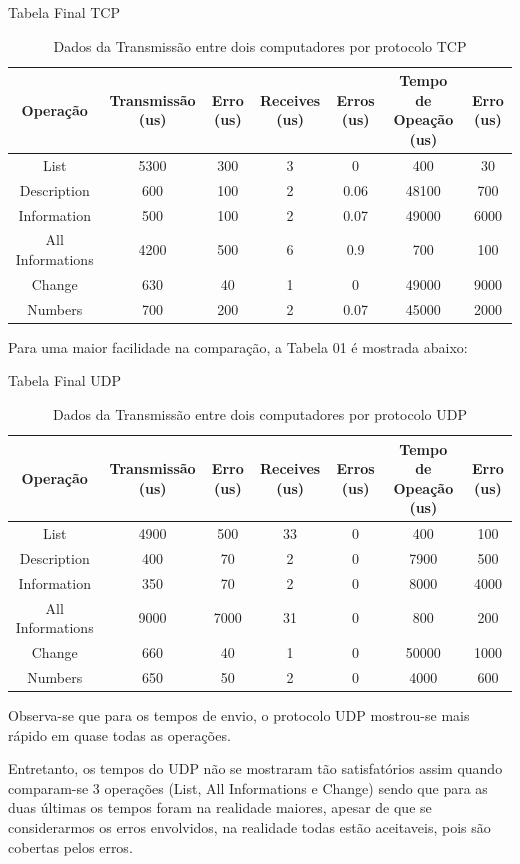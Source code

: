 \documentclass[10pt,a4paper]{report}
\begin{document}
	
	\begin{table}[h]
\caption{Tabela Final TCP}
\begin{tabular}{|c|c|c|c|c|c|c|}
\hline 
Operação & Transmissão (us) & Erro (us) & Receives (us) & Erros (us) & Tempo de Opeação (us) & Erro (us) \\ 
\hline 
List & 5300 & 300 & 3 & 0 & 400 & 30 \\ 
\hline 
Description & 600 & 100 & 2 & 0.06 & 48100 & 700 \\ 
\hline 
Information & 500 & 100 & 2 & 0.07 & 49000 & 6000 \\ 
\hline 
All Informations & 4200 & 500 & 6 & 0.9 & 700 & 100 \\ 
\hline 
Change & 630 & 40 & 1 & 0 & 49000 & 9000 \\ 
\hline 
Numbers & 700 & 200 & 2 & 0.07 & 45000 & 2000 \\ 
\hline 
\end{tabular} 
\caption{Dados da Transmissão entre dois computadores por protocolo TCP}
\end{table}
	
	Para uma maior facilidade na comparação, a Tabela 01 é mostrada abaixo:
	
\begin{table}[h]
\caption{Tabela Final UDP}
\begin{tabular}{|c|c|c|c|c|c|c|}
\hline 
Operação & Transmissão (us) & Erro (us) & Receives (us) & Erros (us) & Tempo de Opeação (us) & Erro (us) \\ 
\hline 
List & 4900 & 500 & 33 & 0 & 400 & 100 \\ 
\hline 
Description & 400 & 70 & 2 & 0 & 7900 & 500 \\ 
\hline 
Information & 350 & 70 & 2 & 0 & 8000 & 4000 \\ 
\hline 
All Informations & 9000 & 7000 & 31 & 0 & 800 & 200 \\ 
\hline 
Change & 660 & 40 & 1 & 0 & 50000 & 1000 \\ 
\hline 
Numbers & 650 & 50 & 2 & 0 & 4000 & 600 \\ 
\hline 
\end{tabular}
\caption{Dados da Transmissão entre dois computadores por protocolo UDP}
\end{table}
Observa-se que para os tempos de envio, o protocolo UDP mostrou-se mais rápido em quase todas as operações.

	Entretanto, os tempos do UDP não se mostraram tão satisfatórios assim quando comparam-se 3 operações (List, All Informations e Change) sendo que para as duas últimas os tempos foram na realidade maiores, apesar de que se considerarmos os erros envolvidos, na realidade todas estão aceitaveis, pois são cobertas pelos erros.
	
\end{document}
